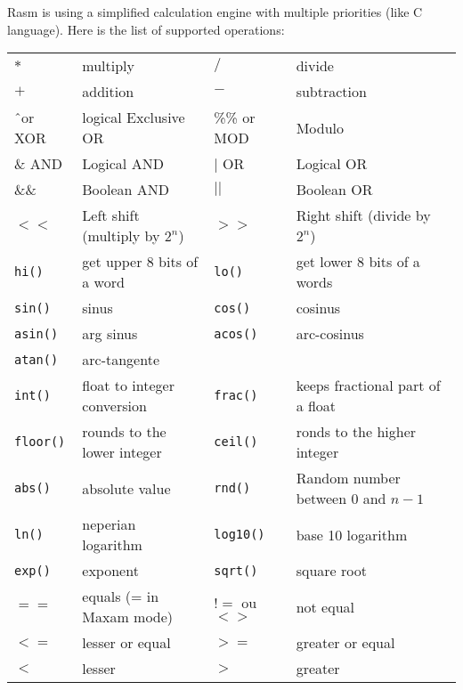 \begin{xen}
Rasm is using a simplified calculation engine with multiple priorities (like C language). Here is the list of supported operations:

\begin{tabular}{ll|ll}
$*$ & multiply &
$/$ & divide \\
$+$ & addition &
$-$ & subtraction \\
\^\  or XOR & logical Exclusive OR &
\%\% or MOD & Modulo \\
\& AND & Logical AND &
$|$ OR & Logical OR \\
\&\& & Boolean AND &
$||$ & Boolean OR \\
$<<$ & Left shift (multiply by $2^n$) &
$>>$ & Right shift (divide by $2^n$) \\

\texttt{hi()} & get upper 8 bits of a word &
\texttt{lo()} & get lower 8 bits of a words \\

\texttt{sin()} & sinus &
\texttt{cos()} & cosinus \\
\texttt{asin()} & arg sinus &
\texttt{acos()} & arc-cosinus \\

\texttt{atan()} & arc-tangente &
& \\

\texttt{int()} & float to integer conversion &
\texttt{frac()} &  keeps fractional part of a float \\
\texttt{floor()} & rounds to the lower integer &
\texttt{ceil()} & ronds to the higher integer \\
\texttt{abs()} & absolute value &
\texttt{rnd()} & Random number between 0 and $n-1$ \\


\texttt{ln()} & neperian logarithm &
\texttt{log10()} & base 10 logarithm \\
\texttt{exp()} & exponent &
\texttt{sqrt()} & square root \\


$==$ & equals (= in Maxam mode) &
$!=$ ou $<>$ & not equal \\
$<=$ & lesser or equal &
$>=$ & greater or  equal \\
$<$ & lesser &
$>$ & greater \\

\end{tabular}

\end{xen}

